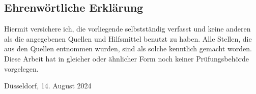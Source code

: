 \begin{otherlanguage}{ngerman}

\chapter*{Ehrenwörtliche Erklärung}

Hiermit versichere ich, die vorliegende \thesistypegerman{} selbstständig verfasst und keine anderen als die angegebenen Quellen und Hilfsmittel benutzt zu haben.
Alle Stellen, die aus den Quellen entnommen wurden, sind als solche kenntlich gemacht worden.
Diese Arbeit hat in gleicher oder ähnlicher Form noch keiner Prüfungsbehörde vorgelegen.

\vspace{3cm}

\noindent Düsseldorf, 14. August 2024 \hfill \thesisauthor{}

\end{otherlanguage}
